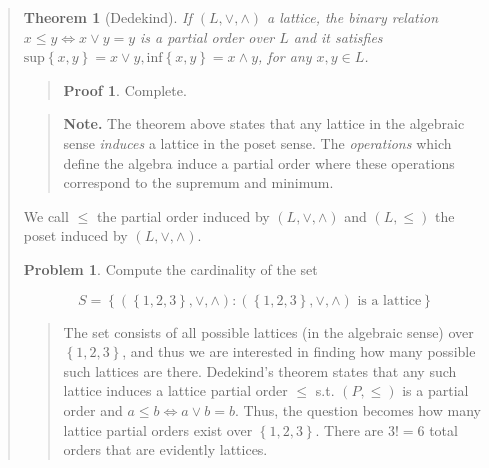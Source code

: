\documentclass[a4paper, 12pt]{article}
\newtheorem{theorem}{Theorem}
\theoremstyle{definition}
\newtheorem{problem}{Problem}
\theoremstyle{definition}
\theoremstyle{definition}
\newtheorem{pro}{Proof}
\begin{document}
\begin{quote}
\begin{theorem}[Dedekind]
    If $(L, \lor, \land)$ a lattice, the binary relation $x \leq y \iff x
    \lor y = y$ is a partial order over $L$ and it satisfies $\text{sup}\left\{ x, y
    \right\} = x \lor y, \text{inf}\left\{ x, y \right\} = x \land y$, for any
    $x, y \in L$.
\end{theorem}


\small
\begin{quote}

\begin{pro}
    Complete.
\end{pro}

\end{quote}
\normalsize


\small
\begin{quote}

\textbf{Note.} The theorem above states that any lattice in the algebraic sense
\textit{induces} a lattice in the poset sense. The \textit{operations} which
define the algebra induce a partial order where these operations correspond to
the supremum and minimum.

\end{quote}
\normalsize


We call $\leq$ the partial order induced by $(L, \lor, \land)$ and $(L, \leq)$ the
poset induced by $(L, \lor, \land)$.

\begin{problem}
    Compute the cardinality of the set 

    \begin{equation*}
        S = \left\{ \left( \left\{ 1, 2,3 \right\}, \lor , \land   \right) : \left( \left\{ 1, 2, 3 \right\}, \lor , \land   \right)  \text{ is a lattice} \right\} 
    \end{equation*}
\end{problem}


\small
\begin{quote}

    The set consists of all possible lattices (in the algebraic sense) over
    $\left\{ 1, 2, 3 \right\} $, and thus we are interested in finding how many
    possible such lattices are there. Dedekind's theorem states that any such
    lattice induces a lattice partial order $\leq$ s.t. $(P, \leq)$ is a
    partial order and $a \leq b \iff a \lor b = b$. Thus, the question becomes
    how many lattice partial orders exist over $\left\{ 1, 2, 3 \right\} $.
    There are $3! = 6$ total orders that are evidently lattices. 
    

\end{quote}
\end{quote}
\end{document}
